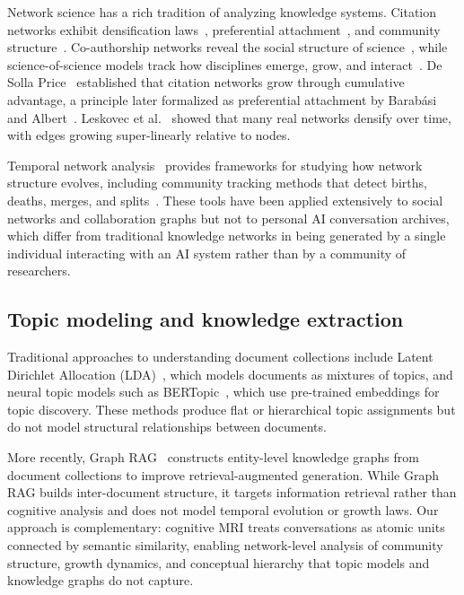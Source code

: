 \documentclass[journal]{IEEEtran}
\begin{document}
Network science has a rich tradition of analyzing knowledge systems.
Citation networks exhibit densification
laws~\cite{leskovec2007graph}, preferential
attachment~\cite{barabasi1999emergence}, and community
structure~\cite{fortunato2010community}.  Co-authorship networks reveal
the social structure of science~\cite{newman2006modularity}, while
science-of-science models track how disciplines emerge, grow, and
interact~\cite{shi2015weaving}.  De Solla Price~\cite{price1965networks}
established that citation networks grow through cumulative advantage, a
principle later formalized as preferential attachment by Barab\'{a}si
and Albert~\cite{barabasi1999emergence}.  Leskovec et
al.~\cite{leskovec2007graph} showed that many real networks densify
over time, with edges growing super-linearly relative to nodes.

Temporal network analysis~\cite{holme2012temporal} provides frameworks
for studying how network structure evolves, including community tracking
methods that detect births, deaths, merges, and
splits~\cite{greene2010tracking, palla2007quantifying}.  These tools
have been applied extensively to social networks and collaboration
graphs but not to personal AI conversation archives, which differ from
traditional knowledge networks in being generated by a single individual
interacting with an AI system rather than by a community of researchers.

\subsection{Topic modeling and knowledge extraction}

Traditional approaches to understanding document collections include
Latent Dirichlet Allocation (LDA)~\cite{blei2003latent}, which models
documents as mixtures of topics, and neural topic models such as
BERTopic~\cite{grootendorst2022bertopic}, which use pre-trained
embeddings for topic discovery.  These methods produce flat or
hierarchical topic assignments but do not model structural relationships
between documents.

More recently, Graph RAG~\cite{edge2024graphrag} constructs entity-level
knowledge graphs from document collections to improve retrieval-augmented
generation.  While Graph RAG builds inter-document structure, it targets
information retrieval rather than cognitive analysis and does not model
temporal evolution or growth laws.  Our approach is complementary:
cognitive MRI treats conversations as atomic units connected by semantic
similarity, enabling network-level analysis of community structure,
growth dynamics, and conceptual hierarchy that topic models and
knowledge graphs do not capture.
\end{document}
